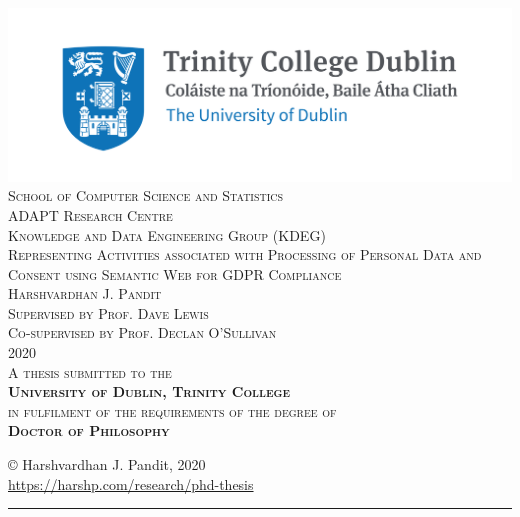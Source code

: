 \pagestyle{empty}
\begin{center}
\scshape
    \includegraphics{img/TCD_logo.png}\\[1cm] 
\large School of Computer Science and Statistics \\[0.25cm]
\small ADAPT Research Centre \\
\small Knowledge and Data Engineering Group (KDEG) \\[1.5cm]

\huge Representing Activities associated with Processing of Personal Data and Consent using Semantic Web for GDPR Compliance \\[1.5cm]
 
\Large Harshvardhan J. Pandit \\[1cm]

\large 
Supervised by Prof. Dave Lewis \\
Co-supervised by Prof. Declan O'Sullivan \\[1cm]

{\small 2020}\\[2cm]

\normalsize
A thesis submitted to the \\
\textbf{University of Dublin, Trinity College} \\
in fulfilment of the requirements of the degree of \\
\textbf{Doctor of Philosophy}

\normalsize

\vfill %
\end{center}
\restoregeometry

\cleardoublepage

\clearpage
\vspace*{\fill}
\begin{center}
    \centering
    \copyright\hspace{0.25cm} Harshvardhan J. Pandit, 2020\\
    \url{https://harshp.com/research/phd-thesis}
    \rule{\textwidth}{1pt}
    \doclicenseThis
\end{center}
\vfill
\clearpage

